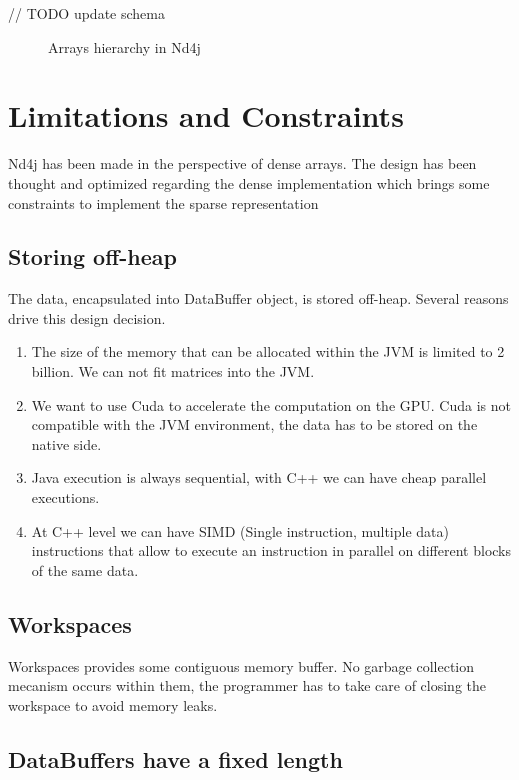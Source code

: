 // TODO update schema
 
\begin{figure}[H]
	\begin{center}
		\label{fig:hierarchy}
		\caption{Arrays hierarchy in Nd4j}
	\end{center}
\end{figure}


\section{Limitations and Constraints}

Nd4j has been made in the perspective of dense arrays. The design has been thought and optimized regarding the dense implementation which brings some constraints to implement the sparse representation
\subsection{Storing off-heap}

The data, encapsulated into DataBuffer object, is stored off-heap. Several reasons drive this design decision.
\begin{enumerate}
	\item The size of the memory that can be allocated within the JVM is limited to 2 billion. We can not fit matrices into the JVM.
	\item We want to use Cuda to accelerate the computation on the GPU. Cuda is not compatible with the JVM environment, the data has to be stored on the native side.
	\item Java execution is always sequential, with C++ we can have cheap parallel executions.
	\item At C++ level we can have SIMD (Single instruction, multiple data) instructions that allow to execute an instruction in parallel on different blocks of the same data.
\end{enumerate}

\subsection{Workspaces}

Workspaces provides some contiguous memory buffer. No garbage collection mecanism occurs within them, the programmer has to take care of closing the workspace to avoid memory leaks.



\subsection{DataBuffers have a fixed length}

